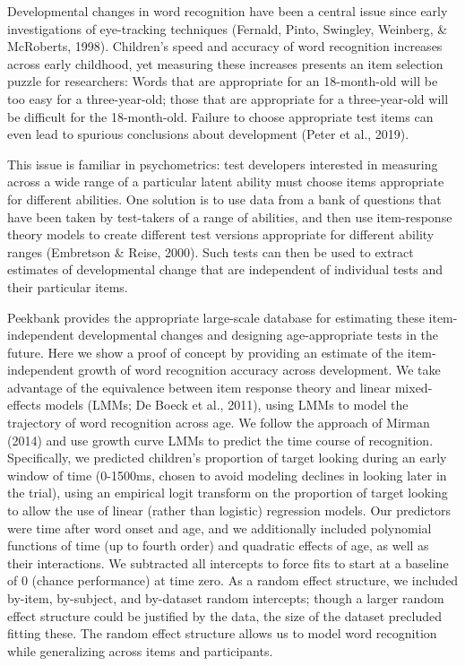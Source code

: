 \documentclass[10pt, letterpaper]{article}
\begin{document}
Developmental changes in word recognition have been a central issue
since early investigations of eye-tracking techniques (Fernald, Pinto,
Swingley, Weinberg, \& McRoberts, 1998). Children's speed and accuracy
of word recognition increases across early childhood, yet measuring
these increases presents an item selection puzzle for researchers: Words
that are appropriate for an 18-month-old will be too easy for a
three-year-old; those that are appropriate for a three-year-old will be
difficult for the 18-month-old. Failure to choose appropriate test items
can even lead to spurious conclusions about development (Peter et al.,
2019).

This issue is familiar in psychometrics: test developers interested in
measuring across a wide range of a particular latent ability must choose
items appropriate for different abilities. One solution is to use data
from a bank of questions that have been taken by test-takers of a range
of abilities, and then use item-response theory models to create
different test versions appropriate for different ability ranges
(Embretson \& Reise, 2000). Such tests can then be used to extract
estimates of developmental change that are independent of individual
tests and their particular items.

Peekbank provides the appropriate large-scale database for estimating
these item-independent developmental changes and designing
age-appropriate tests in the future. Here we show a proof of concept by
providing an estimate of the item-independent growth of word recognition
accuracy across development. We take advantage of the equivalence
between item response theory and linear mixed-effects models (LMMs; De
Boeck et al., 2011), using LMMs to model the trajectory of word
recognition across age. We follow the approach of Mirman (2014) and use
growth curve LMMs to predict the time course of recognition.
Specifically, we predicted children's proportion of target looking
during an early window of time (0-1500ms, chosen to avoid modeling
declines in looking later in the trial), using an empirical logit
transform on the proportion of target looking to allow the use of linear
(rather than logistic) regression models. Our predictors were time after
word onset and age, and we additionally included polynomial functions of
time (up to fourth order) and quadratic effects of age, as well as their
interactions. We subtracted all intercepts to force fits to start at a
baseline of 0 (chance performance) at time zero. As a random effect
structure, we included by-item, by-subject, and by-dataset random
intercepts; though a larger random effect structure could be justified
by the data, the size of the dataset precluded fitting these. The random
effect structure allows us to model word recognition while generalizing
across items and participants.
\end{document}
